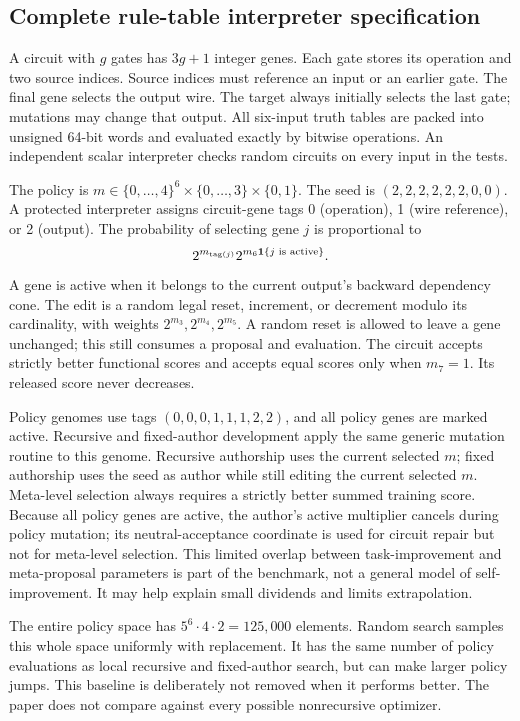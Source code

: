 \subsection{Complete rule-table interpreter specification}
A circuit with $g$ gates has $3g+1$ integer genes. Each gate stores its operation and two source indices. Source indices must reference an input or an earlier gate. The final gene selects the output wire. The target always initially selects the last gate; mutations may change that output. All six-input truth tables are packed into unsigned 64-bit words and evaluated exactly by bitwise operations. An independent scalar interpreter checks random circuits on every input in the tests.

The policy is $m\in\{0,\ldots,4\}^6\times\{0,\ldots,3\}\times\{0,1\}$. The seed is $(2,2,2,2,2,2,0,0)$. A protected interpreter assigns circuit-gene tags 0 (operation), 1 (wire reference), or 2 (output). The probability of selecting gene $j$ is proportional to
\[
 2^{m_{\operatorname{tag}(j)}}2^{m_6\mathbf 1\{j\text{ is active}\}}.
\]
A gene is active when it belongs to the current output's backward dependency cone. The edit is a random legal reset, increment, or decrement modulo its cardinality, with weights $2^{m_3},2^{m_4},2^{m_5}$. A random reset is allowed to leave a gene unchanged; this still consumes a proposal and evaluation. The circuit accepts strictly better functional scores and accepts equal scores only when $m_7=1$. Its released score never decreases.

Policy genomes use tags $(0,0,0,1,1,1,2,2)$, and all policy genes are marked active. Recursive and fixed-author development apply the same generic mutation routine to this genome. Recursive authorship uses the current selected $m$; fixed authorship uses the seed as author while still editing the current selected $m$. Meta-level selection always requires a strictly better summed training score. Because all policy genes are active, the author's active multiplier cancels during policy mutation; its neutral-acceptance coordinate is used for circuit repair but not for meta-level selection. This limited overlap between task-improvement and meta-proposal parameters is part of the benchmark, not a general model of self-improvement. It may help explain small dividends and limits extrapolation.

The entire policy space has $5^6\cdot4\cdot2=125,000$ elements. Random search samples this whole space uniformly with replacement. It has the same number of policy evaluations as local recursive and fixed-author search, but can make larger policy jumps. This baseline is deliberately not removed when it performs better. The paper does not compare against every possible nonrecursive optimizer.

